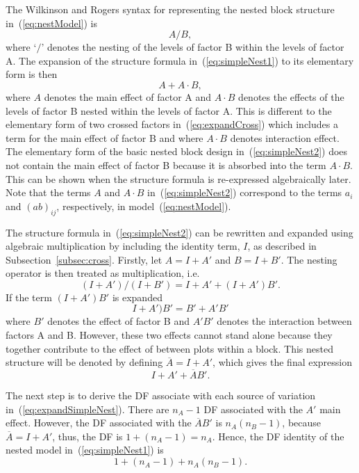 \documentclass[11pt,a4paper]{article}
\begin{document}
The Wilkinson and Rogers syntax for representing the nested block structure in~(\ref{eq:nestModel}) is
\begin{equation} \label{eq:simpleNest1}
A/B,
\end{equation}
where `$/$' denotes the nesting of the levels of factor B within the levels of factor A. The expansion of the structure formula in~(\ref{eq:simpleNest1}) to its elementary form is then
\begin{equation}\label{eq:simpleNest2}
A + A\cdot B,
\end{equation}
where $A$ denotes the main effect of factor A and $A\cdot B$ denotes the effects of the levels of factor B nested within the levels of factor A. This is different to the elementary form of two crossed factors in~(\ref{eq:expandCross}) which includes a term for the main effect of factor B and where $A\cdot B$ denotes interaction effect. The elementary form of the basic nested block design in~(\ref{eq:simpleNest2}) does not contain the main effect of factor B because it is absorbed into the term $A\cdot B$. This can be shown when the structure formula is re-expressed algebraically later. Note that the terms $A$ and $A\cdot B$ in~(\ref{eq:simpleNest2}) correspond to the terms $a_{i}$ and $(ab)_{ij}$, respectively, in model~(\ref{eq:nestModel}).

The structure formula in~(\ref{eq:simpleNest2}) can be rewritten and expanded using algebraic multiplication by including the identity term, $I$, as described in Subsection~\ref{subsec:cross}. Firstly, let $A = I+A'$ and $B = I+B'$. The nesting operator is then treated as multiplication, i.e.
\[(I + A')/(I + B') = I + A'+ (I + A')B'.\]
If the term $(I + A')B'$ is expanded
\[I + A')B' = B' + A'B' \]
where $B'$ denotes the effect of factor B and $A'B'$ denotes the interaction between factors A and B. However, these two effects cannot stand alone because they together contribute to the effect of between plots within a block. This nested structure will be denoted by defining $\overline{A}=I+A'$, which gives the final expression
\begin{equation}\label{eq:expandSimpleNest}
I + A'+ \overline{A}B'.
\end{equation}

The next step is to derive the DF associate with each source of variation in~(\ref{eq:expandSimpleNest}). There are $n_A - 1$ DF associated with the $A'$ main effect. However, the DF associated with the $\overline{A}B'$ is $n_A (n_B - 1)$, because $\overline{A} = I + A'$, thus, the DF is $1 + (n_A - 1) = n_A$. Hence, the DF identity of the nested model in~(\ref{eq:simpleNest1}) is 
\begin{equation}\label{eq:simpleNest1DF}
1 + (n_A - 1) + n_A(n_B - 1).
\end{equation}
\end{document}
